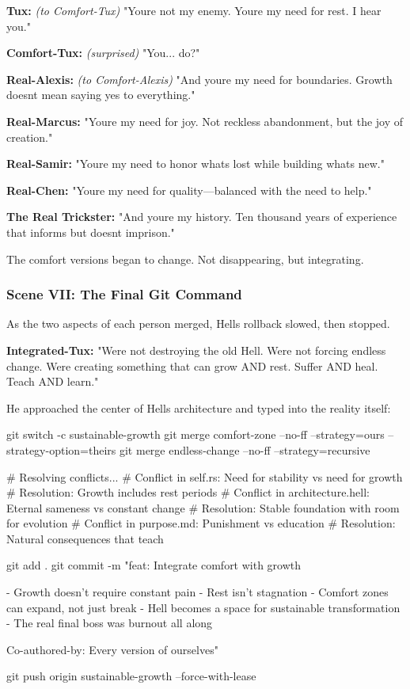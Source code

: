 \textbf{Tux:} \emph{(to Comfort-Tux)} "You\textquotesingle re not my enemy. You\textquotesingle re my need for rest. I hear you."

\textbf{Comfort-Tux:} \emph{(surprised)} "You... do?"

\textbf{Real-Alexis:} \emph{(to Comfort-Alexis)} "And you\textquotesingle re my need for boundaries. Growth doesn\textquotesingle t mean saying yes to everything."

\textbf{Real-Marcus:} "You\textquotesingle re my need for joy. Not reckless abandonment, but the joy of creation."

\textbf{Real-Samir:} "You\textquotesingle re my need to honor what\textquotesingle s lost while building what\textquotesingle s new."

\textbf{Real-Chen:} "You\textquotesingle re my need for quality---balanced with the need to help."

\textbf{The Real Trickster:} "And you\textquotesingle re my history. Ten thousand years of experience that informs but doesn\textquotesingle t imprison."

The comfort versions began to change. Not disappearing, but integrating.

\bookdivider

\subsubsection{Scene VII: The Final Git Command}\label{scene-vii-the-final-git-command}

As the two aspects of each person merged, Hell\textquotesingle s rollback slowed, then stopped.

\textbf{Integrated-Tux:} "We\textquotesingle re not destroying the old Hell. We\textquotesingle re not forcing endless change. We\textquotesingle re creating something that can grow AND rest. Suffer AND heal. Teach AND learn."

He approached the center of Hell\textquotesingle s architecture and typed into the reality itself:

\begin{codeblock}
git switch -c sustainable-growth
git merge comfort-zone --no-ff --strategy=ours --strategy-option=theirs
git merge endless-change --no-ff --strategy=recursive

# Resolving conflicts...
# Conflict in self.rs: Need for stability vs need for growth
# Resolution: Growth includes rest periods
# Conflict in architecture.hell: Eternal sameness vs constant change  
# Resolution: Stable foundation with room for evolution
# Conflict in purpose.md: Punishment vs education
# Resolution: Natural consequences that teach

git add .
git commit -m "feat: Integrate comfort with growth

- Growth doesn't require constant pain
- Rest isn't stagnation  
- Comfort zones can expand, not just break
- Hell becomes a space for sustainable transformation
- The real final boss was burnout all along

Co-authored-by: Every version of ourselves"

git push origin sustainable-growth --force-with-lease
\end{codeblock}

